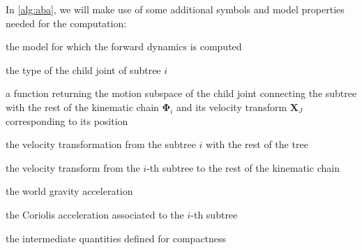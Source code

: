 In \cref{alg:aba}, we will make use of some additional symbols and model properties needed for the computation:

\begin{description}
    \begin{description}[leftmargin=!,labelwidth=\widthof{$\mathbf{a}_g := \begin{bmatrix} \mathbf{g} & \mathbbm{0}_{3\times1} \end{bmatrix}$}]
        \item[$\mathcal{M}$] the model for which the forward dynamics is computed
        \item[$\text{jtype}(i)$] the type of the child joint of subtree $i$
        \item[$\text{jcalc}(\cdot)$] a function returning the motion subspace of the child joint connecting the subtree with the rest of the kinematic chain $\boldsymbol{\Phi}_i$ and its velocity transform $\mathbf{X}_J$ corresponding to its position
        \item[$\textbf{X}_T(i)$] the velocity transformation from the subtree $i$ with the rest of the tree
        \item[${}^i\mathbf{X}_{\lambda(i)} = {}^{\lambda(i)}\mathbf{X}_{i}^{-\top}$] the velocity transform from the $i$-th subtree to the rest of the kinematic chain
        \item[$\mathbf{a}_g := \begin{bmatrix} \mathbf{g} & \mathbbm{0}_{3\times1} \end{bmatrix}$] the world gravity acceleration
        \item[$\mathbf{c}_i$] the Coriolis acceleration associated to the $i$-th subtree
        \item[$\mathbf{U}_i , \mathbf{D}_i, \mathbf{u}_i$] the intermediate quantities defined for compactness
    \end{description}
\end{description}

